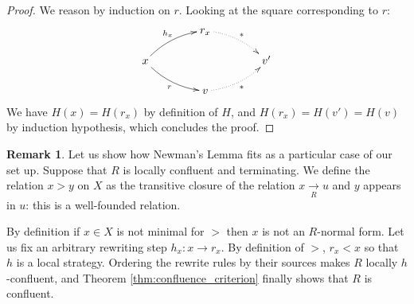 \documentclass[10pt]{easychair}
\theoremstyle{definition}
\newtheorem{remark}[theorem]{Remark}
\newcommand\rewR{\underset{R}{\longrightarrow}}
\begin{document}
\begin{proof}
 We reason by induction on $r$. Looking at the square corresponding to $r$:
    \[
    \xymatrix @C = 4em @R = 1.5em{
      &
      r_x
      \ar@{.>}@/^/ [rd] ^{*}
      & \\
      x
      \ar@/^/ [ru] ^{h_x}
      \ar@/_/ [rd] _{r}
      &
      &
      v'
      \\
      &
      v
      \ar@{.>}@/_/  [ru] _{*}
      &
    }
  \]
  We have $H(x) = H(r_x)$ by definition of $H$, and $H(r_x) = H(v') = H(v)$ by induction hypothesis, which concludes the proof.
\end{proof}


\begin{remark}
Let us show how Newman's Lemma fits as a particular case of our set up. 
Suppose that $R$ is locally confluent and terminating. We define the relation $x > y$ on $X$ as the transitive closure of the relation $x \rewR u$ and $y$ appears in $u$: this is a well-founded relation. 

By definition if $x \in X$ is not minimal for $>$ then $x$ is not an $R$-normal form. Let us fix an arbitrary rewriting step $h_x: x \to r_x$.  By definition of $>$, $r_x < x$ so that $h$ is a local strategy. Ordering the rewrite rules by their sources makes $R$ locally $h$-confluent, and Theorem \ref{thm:confluence_criterion} finally shows that $R$ is confluent.  
\end{remark}
\end{document}
